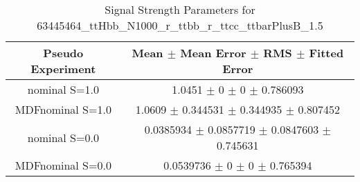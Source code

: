\begin{table}
\centering
\caption{Signal Strength Parameters for 63445464\_ttHbb\_N1000\_r\_ttbb\_r\_ttcc\_ttbarPlusB\_1.5}
\begin{tabular}{cc}
\toprule
Pseudo Experiment & Mean $\pm$ Mean Error $\pm$ RMS $\pm$ Fitted Error\\
\midrule
nominal S=1.0 & \num{1.0451} $\pm$ \num{0} $\pm$ \num{0} $\pm$ \num{0.786093}\\
MDFnominal S=1.0 & \num{1.0609} $\pm$ \num{0.344531} $\pm$ \num{0.344935} $\pm$ \num{0.807452}\\
nominal S=0.0 & \num{0.0385934} $\pm$ \num{0.0857719} $\pm$ \num{0.0847603} $\pm$ \num{0.745631}\\
MDFnominal S=0.0 & \num{0.0539736} $\pm$ \num{0} $\pm$ \num{0} $\pm$ \num{0.765394}\\
\bottomrule
\end{tabular}
\end{table}